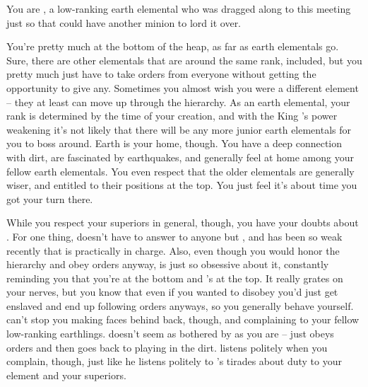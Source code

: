 \documentclass[char]{elementals}
\begin{document}
\name{\cMiniEarth{}}

You are \cMiniEarth{\intro}, a low-ranking earth elemental who was dragged along to this meeting just so that \cLoyal{\intro} could have another minion to lord it over.

You're pretty much at the bottom of the heap, as far as earth elementals go.  Sure, there are other elementals that are around the same rank, \cMinion{\intro} included, but you pretty much just have to take orders from everyone without getting the opportunity to give any.  Sometimes you almost wish you were a different element -- they at least can move up through the hierarchy.  As an earth elemental, your rank is determined by the time of your creation, and with the King \cEarthKing{}'s power weakening it's not likely that there will be any more junior earth elementals for you to boss around.  Earth is your home, though.  You have a deep connection with dirt, are fascinated by earthquakes, and generally feel at home among your fellow earth elementals.  You even respect that the older elementals are generally wiser, and entitled to their positions at the top.  You just feel it's about time you got your turn there.

While you respect your superiors in general, though, you have your doubts about \cLoyal{}.  For one thing, \cLoyal{\they} doesn't have to answer to anyone but \cEarthKing{}, and \cEarthKing{\they} has been so weak recently that \cLoyal{} is practically in charge.  Also, even though you would honor the hierarchy and obey orders anyway, \cLoyal{\they} is just so obsessive about it, constantly reminding you that you're at the bottom and \cLoyal{\they}'s at the top.  It really grates on your nerves, but you know that even if you wanted to disobey you'd just get enslaved and end up following orders anyways, so you generally behave yourself.  \cLoyal{} can't stop you making faces behind \cLoyal{\their} back, though, and complaining to your fellow low-ranking earthlings.  \cMinion{} doesn't seem as bothered by \cLoyal{} as you are -- \cMinion{\they} just obeys orders and then goes back to playing in the dirt.  \cMinion{\They} listens politely when you complain, though, just like he listens politely to \cLoyal{}'s tirades about duty to your element and your superiors.
\end{document}
